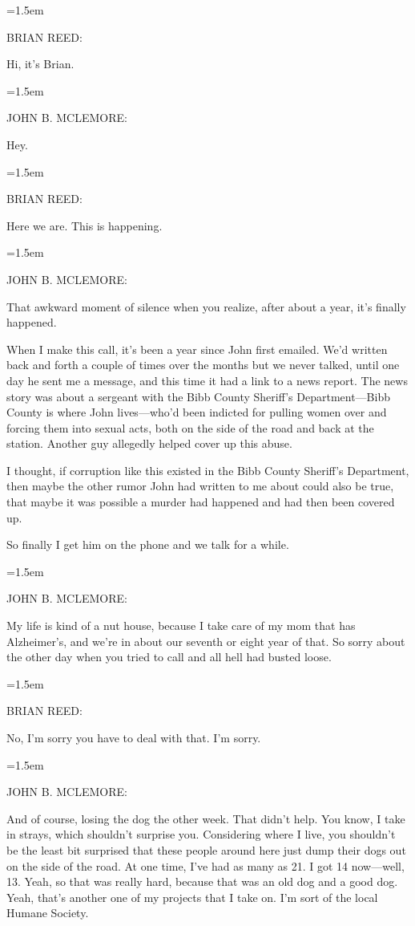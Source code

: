 \documentclass[10pt,a4paper]{article}
\newcommand{\speakerlabel}[1]{{\plantin\color{speakerblue}\MakeUppercase{#1}:}}
\newenvironment{speech}[1]{%
		\par\medskip
		\begin{list}{}{%
			\leftmargin=1.5em
			\rightmargin=0pt
			\topsep=0pt
			\partopsep=0pt
			\parsep=0.5\baselineskip
			\itemsep=0pt}%
		\item\speakerlabel{#1}\enspace\ignorespaces
	}{\end{list}}
\newenvironment{narration}[1]{%
		\par\medskip\noindent\speakerlabel{#1}\enspace\ignorespaces
	}{\par\medskip}
\begin{document}
\begin{speech}{BRIAN REED}
Hi, it's Brian.
\end{speech}
\begin{speech}{JOHN B. McLEMORE}
Hey.
\end{speech}
\begin{speech}{BRIAN REED}
Here we are. This is happening.
\end{speech}
\begin{speech}{JOHN B. McLEMORE}
That awkward moment of silence when you realize, after about a year, it's finally happened.
\end{speech}
\begin{narration}{BRIAN REED}
When I make this call, it's been a year since John first emailed. We'd written back and forth a couple of times over the months but we never talked, until one day he sent me a message, and this time it had a link to a news report. The news story was about a sergeant with the Bibb County Sheriff's Department—Bibb County is where John lives—who'd been indicted for pulling women over and forcing them into sexual acts, both on the side of the road and back at the station. Another guy allegedly helped cover up this abuse.

I thought, if corruption like this existed in the Bibb County Sheriff's Department, then maybe the other rumor John had written to me about could also be true, that maybe it was possible a murder had happened and had then been covered up.

So finally I get him on the phone and we talk for a while.
\end{narration}
\begin{speech}{JOHN B. McLEMORE}
My life is kind of a nut house, because I take care of my mom that has Alzheimer's, and we're in about our seventh or eight year of that. So sorry about the other day when you tried to call and all hell had busted loose.
\end{speech}
\begin{speech}{BRIAN REED}
No, I'm sorry you have to deal with that. I'm sorry.
\end{speech}
\begin{speech}{JOHN B. McLEMORE}
And of course, losing the dog the other week. That didn't help. You know, I take in strays, which shouldn't surprise you. Considering where I live, you shouldn't be the least bit surprised that these people around here just dump their dogs out on the side of the road. At one time, I've had as many as 21. I got 14 now—well, 13. Yeah, so that was really hard, because that was an old dog and a good dog. Yeah, that's another one of my projects that I take on. I'm sort of the local Humane Society.
\end{speech}
\end{document}
